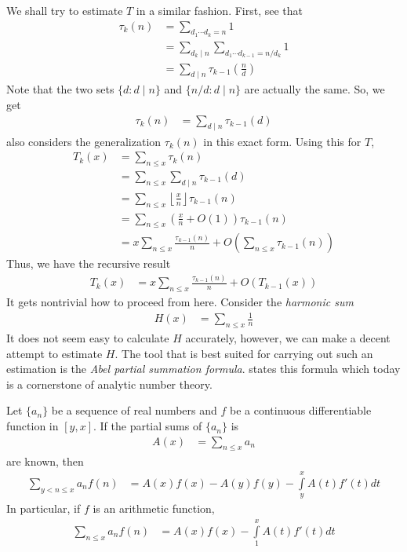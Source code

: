 \documentclass[elemannt.tex]{subfile}
\begin{document}
	We shall try to estimate $T$ in a similar fashion. First, see that
		\begin{align*}
			\tau_{k}(n)
				& = \sum_{d_{1}\cdots d_{k}=n}1\\
				& = \sum_{d_{k}\mid n}\sum_{d_{1}\cdots d_{k-1}=n/d_{k}}1\\
				& = \sum_{d\mid n}\tau_{k-1}\left(\frac{n}{d}\right)
		\end{align*}
	Note that the two sets $\{d:d\mid n\}$ and $\{n/d:d\mid n\}$ are actually the same. So, we get
		\begin{align*}
			\tau_{k}(n)
				& = \sum_{d\mid n}\tau_{k-1}(d)
		\end{align*}
	\textcite[($\S$8)]{beumer_1962} also considers the generalization $\tau_{k}(n)$ in this exact form. Using this for $T$,
		\begin{align*}
			T_{k}(x)
				& = \sum_{n\leq x}\tau_{k}(n)\\
				& = \sum_{n\leq x}\sum_{d\mid n}\tau_{k-1}(d)\\
				& = \sum_{n\leq x}\left\lfloor{\frac{x}{n}}\right\rfloor\tau_{k-1}(n)\\
				& = \sum_{n\leq x}\left(\frac{x}{n}+O(1)\right)\tau_{k-1}(n)\\
				& = x\sum_{n\leq x}\frac{\tau_{k-1}(n)}{n}+O\left(\sum_{n\leq x}\tau_{k-1}(n)\right)
		\end{align*}
	Thus, we have the recursive result
		\begin{align*}
			T_{k}(x)
				& = x\sum_{n\leq x}\frac{\tau_{k-1}(n)}{n}+O(T_{k-1}(x))
		\end{align*}
	It gets nontrivial how to proceed from here. Consider the \textit{harmonic sum}
		\begin{align*}
			H(x)
			& = \sum_{n\leq x}\frac{1}{n}
		\end{align*}
	It does not seem easy to calculate $H$ accurately, however, we can make a decent attempt to estimate $H$. The tool that is best suited for carrying out such an estimation is the \textit{Abel partial summation formula}. \textcite{abel_1826} states this formula which today is a cornerstone of analytic number theory.
		\begin{theorem}\label{thm:abel}
			Let $\{a_{n}\}$ be a sequence of real numbers and $f$ be a continuous differentiable function in $[y,x]$. If the partial sums of $\{a_{n}\}$ is
				\begin{align*}
					A(x)
						& = \sum_{n\leq x}a_{n}
				\end{align*}
			are known, then
				\begin{align*}
					\sum_{y<n\leq x}a_{n}f(n)
						& = A(x)f(x)-A(y)f(y)-\int\limits_{y}^{x}A(t)f'(t)dt
				\end{align*}
			In particular, if $f$ is an arithmetic function,
				\begin{align*}
					\sum_{n\leq x}a_{n}f(n)
						& = A(x)f(x)-\int\limits_{1}^{x}A(t)f'(t)dt
				\end{align*}
		\end{theorem}
\end{document}
